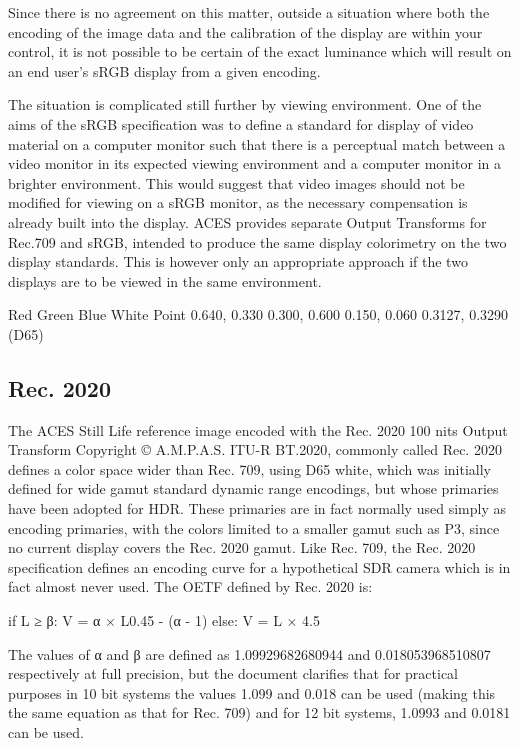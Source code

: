 Since there is no agreement on this matter, outside a situation where both the encoding of the image data and the calibration of the display are within your control, it is not possible to be certain of the exact luminance which will result on an end user's sRGB display from a given encoding.

The situation is complicated still further by viewing environment. One of the aims of the sRGB specification was to define a standard for display of video material on a computer monitor such that there is a perceptual match between a video monitor in its expected viewing environment and a computer monitor in a brighter environment. This would suggest that video images should not be modified for viewing on a sRGB monitor, as the necessary compensation is already built into the display. ACES provides separate Output Transforms for Rec.709 and sRGB, intended to produce the same display colorimetry on the two display standards. This is however only an appropriate approach if the two displays are to be viewed in the same environment.



Red
Green
Blue
White Point
0.640, 0.330
0.300, 0.600
0.150, 0.060
0.3127, 0.3290 (D65)

\subsection{Rec. 2020}
\label{subsec:rec-2020}

The ACES Still Life reference image encoded with the Rec. 2020 100 nits Output Transform
Copyright © A.M.P.A.S.
ITU-R BT.2020, commonly called Rec. 2020 defines a color space wider than Rec. 709, using D65 white, which was initially defined for wide gamut standard dynamic range encodings, but whose primaries have been adopted for HDR. These primaries are in fact normally used simply as encoding primaries, with the colors limited to a smaller gamut such as P3, since no current display covers the Rec. 2020 gamut. Like Rec. 709, the Rec. 2020 specification defines an encoding curve for a hypothetical SDR camera which is in fact almost never used. The OETF defined by Rec. 2020 is:

	if L ≥ β:
            		V = α × L0.45 - (α - 1)
	else:
		V = L × 4.5

The values of α and β are defined as 1.09929682680944 and 0.018053968510807 respectively at full precision, but the document clarifies that for practical purposes in 10 bit systems the values 1.099 and 0.018 can be used (making this the same equation as that for Rec. 709) and for 12 bit systems, 1.0993 and 0.0181 can be used.

